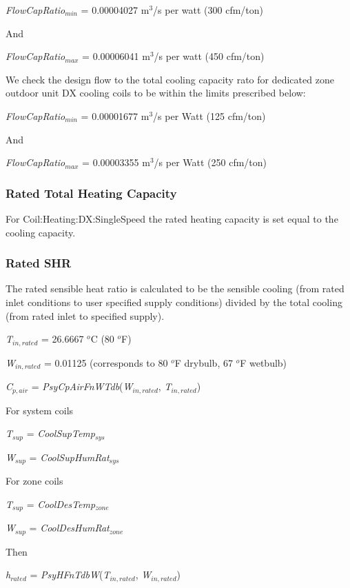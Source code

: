 \emph{FlowCapRatio\(_{min}\)} = 0.00004027 m\(^{3}\)/s per watt (300 cfm/ton)

And

\emph{FlowCapRatio\(_{max}\)} = 0.00006041 m\(^{3}\)/s per watt (450 cfm/ton)

We check the design flow to the total cooling capacity rato for dedicated zone outdoor unit DX cooling coils to be within the limits prescribed below:

\emph{FlowCapRatio\(_{min}\)} = 0.00001677 m\(^{3}\)/s per Watt (125 cfm/ton)

And

\emph{FlowCapRatio\(_{max}\)} = 0.00003355 m\(^{3}\)/s per Watt (250 cfm/ton)

\subsubsection{Rated Total Heating Capacity}\label{rated-total-heating-capacity-2}

For Coil:Heating:DX:SingleSpeed the rated heating capacity is set equal to the cooling capacity.

\subsubsection{Rated SHR}\label{rated-shr}

The rated sensible heat ratio is calculated to be the sensible cooling (from rated inlet conditions to user specified supply conditions) divided by the total cooling (from rated inlet to specified supply).

\emph{T\(_{in,rated}\)} = 26.6667 \(^{o}\)C (80 \(^{o}\)F)

\emph{W\(_{in,rated}\)} = 0.01125 (corresponds to 80 \(^{o}\)F drybulb, 67 \(^{o}\)F wetbulb)

\emph{C\(_{p,air}\)} = \emph{PsyCpAirFnWTdb}(\emph{W\(_{in,rated}\)}, \emph{T\(_{in,rated}\)})

For system coils

\emph{T\(_{sup}\)} = \emph{CoolSupTemp\(_{sys}\)}

\emph{W\(_{sup}\)} = \emph{CoolSupHumRat\(_{sys}\)}

For zone coils

\emph{T\(_{sup}\)} = \emph{CoolDesTemp\(_{zone}\)}

\emph{W\(_{sup}\)} = \emph{CoolDesHumRat\(_{zone}\)}

Then

\emph{h\(_{rated}\)} = \emph{PsyHFnTdbW}(\emph{T\(_{in,rated}\)}, \emph{W\(_{in,rated}\)})

